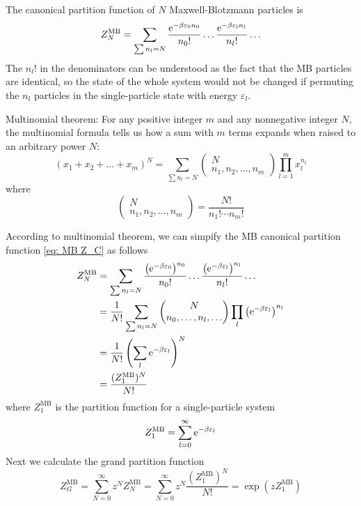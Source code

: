 \documentclass[10pt]{article}
\begin{document}
	The canonical partition function of $N$ Maxwell-Blotzmann particles is
	\begin{equation}
		Z_N^{\mathrm{MB}} = \sum_{\sum n_l = N} \frac{\e^{-\beta \varepsilon_0 n_0}}{n_0 !} \dots \frac{\e^{-\beta \varepsilon_l n_l}}{n_l !} \dots \label{eq: MB Z_C}
	\end{equation}
	The $n_l !$ in the denominators can be understood as the fact that the MB particles are identical, so the state of the whole system would not be changed if permuting the $n_l$ particles in the single-particle state with energy $\varepsilon_l$.
	\begin{theorem}
		Multinomial theorem: For any positive integer $m$ and any nonnegative integer $N$, the multinomial formula tells us how a sum with $m$ terms expands when raised to an arbitrary power $N$:
		\begin{equation}
			(x_1 + x_2 + \dots + x_m)^N = \sum_{\sum n_l = N}
			\begin{pmatrix}
				N \\
				n_1, n_2, \dots, n_m
			\end{pmatrix}
			\prod_{l = 1}^{m} x_l^{n_l}
		\end{equation}
		where
		\begin{equation}
			\begin{pmatrix}
				N \\
				n_1, n_2, \dots, n_m
			\end{pmatrix}
			= \frac{N!}{n_1! \cdots n_m!}
		\end{equation}
	\end{theorem}
	According to multinomial theorem, we can simpify the MB canonical partition function \eqref{eq: MB Z_C} as follows
	\begin{align*}
		Z_N^{\mathrm{MB}} &= \sum_{\sum n_l = N} \frac{\left({\mathrm{e}}^{-\beta \varepsilon_0}\right)^{n_0}}{n_0 !} \dots \frac{\left({\mathrm{e}}^{-\beta \varepsilon_l}\right)^{n_l}}{n_l !} \dots \\
		&= \frac{1}{N!} \sum_{\sum n_l = N}
		\begin{pmatrix}
			N \\
			n_0, \dots, n_l, \dots
		\end{pmatrix}
		\prod_l \left({\mathrm{e}}^{-\beta \varepsilon_l}\right)^{n_l} \\
		&= \frac{1}{N!} \left(\sum_l {\mathrm{e}}^{-\beta \varepsilon_l}\right)^{N} \\
		&= \frac{(Z_1^{\mathrm{MB}})^N}{N!}
	\end{align*}
	where $Z_1^{\mathrm{MB}}$ is the partition function for a single-particle system
	\begin{equation}
		Z_1^{\mathrm{MB}} = \sum_{l=0}^{\infty} {\mathrm{e}}^{-\beta \varepsilon_l}
	\end{equation}
	Next we calculate the grand partition function
	\begin{equation}
		Z_G^{\mathrm{MB}} = \sum_{N=0}^{\infty} z^N Z_N^{\mathrm{MB}} = \sum_{N=0}^{\infty} z^N \frac{(Z_1^{\mathrm{MB}})^N}{N!} = \exp\left(z Z_1^{\mathrm{MB}}\right)
	\end{equation}
\end{document}
